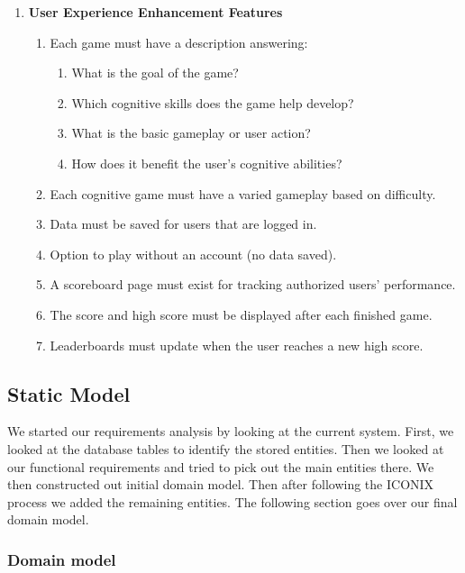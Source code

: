 \documentclass[11pt,a4paper]{article}
\begin{document}
\begin{enumerate}[label=\arabic*.]
  \item \textbf{User Experience Enhancement Features}
    \begin{enumerate}[label=\alph*)]
      \item Each game must have a description answering:
        \begin{enumerate}[label=\roman*.]
          \item What is the goal of the game?
          \item Which cognitive skills does the game help develop?
          \item What is the basic gameplay or user action?
          \item How does it benefit the user’s cognitive abilities?
        \end{enumerate}
      \item Each cognitive game must have a varied gameplay based on difficulty.
      \item Data must be saved for users that are logged in.
      \item Option to play without an account (no data saved).
      \item A scoreboard page must exist for tracking authorized users’ performance.
      \item The score and high score must be displayed after each finished game.
      \item Leaderboards must update when the user reaches a new high score.
    \end{enumerate}
\end{enumerate}





\subsection{Static Model}
We started our requirements analysis by looking at the current system. First, we looked at the database tables to identify the stored entities. Then we looked at our functional requirements and tried to pick out the main entities there. We then constructed out initial domain model. Then after following the ICONIX process we added the remaining entities. The following section goes over our final domain model.

\subsubsection{Domain model}
\end{document}
